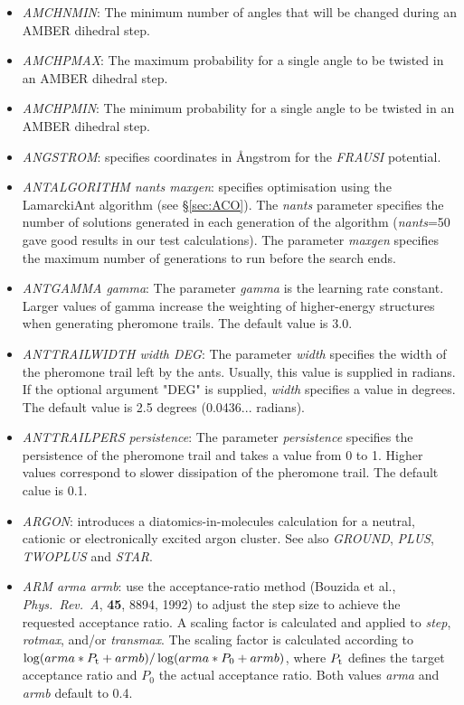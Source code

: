 \documentclass[12pt,a4paper,dvips]{article}
\begin{document}
\begin{itemize}
\item {\it AMCHNMIN\/}: The minimum number of angles that will be changed during an AMBER dihedral step.

\item {\it AMCHPMAX\/}: The maximum probability for a single angle to be twisted in an AMBER dihedral step.

\item {\it AMCHPMIN\/}: The minimum probability for a single angle to be twisted in an AMBER dihedral step.

\item {\it ANGSTROM\/}: specifies coordinates in \AA ngstrom for the {\it FRAUSI\/}
potential.

\item {\it ANTALGORITHM nants maxgen}: specifies optimisation using the LamarckiAnt algorithm
(see \S \ref{sec:ACO}). The {\it nants} parameter specifies the number of solutions
generated in each generation of the algorithm ({\it nants}=50 gave good results
in our test calculations). The parameter {\it maxgen} specifies the maximum number
of generations to run before the search ends.

\item {\it ANTGAMMA gamma}: The parameter {\it gamma} is the learning rate constant.
Larger values of gamma increase the weighting of higher-energy structures when
generating pheromone trails. The default value is 3.0.

\item {\it ANTTRAILWIDTH width DEG}: The parameter {\it width} specifies the
width of the pheromone trail left by the ants. Usually, this value is supplied in
radians. If the optional argument "DEG" is supplied, {\it width} specifies a
value in degrees. The default value is 2.5 degrees (0.0436... radians).

\item {\it ANTTRAILPERS persistence}: The parameter {\it persistence} specifies the
persistence of the pheromone trail and takes a value from 0 to 1. Higher values
correspond to slower dissipation of the pheromone trail. The default calue is 0.1.

\item {\it ARGON\/}: introduces a diatomics-in-molecules calculation for
a neutral, cationic or electronically excited argon cluster. See also
{\it GROUND\/}, {\it PLUS\/}, {\it TWOPLUS\/} and {\it STAR\/}.

\item{\it ARM arma armb}: use the acceptance-ratio method (Bouzida et al., {\it Phys.~Rev.~A},
{\bf 45}, 8894, 1992)  to adjust the step size to achieve the requested 
acceptance ratio. A scaling factor is calculated and applied to {\it step}, {\it rotmax},
and/or {\it transmax}. The scaling factor is calculated according to 
$\log(arma*P_{\rm t}+armb)/\log(arma*P_0+armb)$, where $P_{\rm t}$ defines the
target acceptance ratio and $P_0$ the actual acceptance ratio. Both values {\it arma} and
{\it armb} default to 0.4.


\end{itemize}
\end{document}
